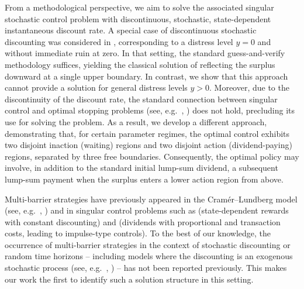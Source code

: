 \documentclass[11pt]{article} %
\numberwithin{komcounter}{section}
\numberwithin{equation}{section}
\numberwithin{theorem}{section}
\begin{document}
From a methodological perspective, we aim to solve the associated singular stochastic control problem with discontinuous, stochastic, state-dependent instantaneous discount rate. 
A special case of discontinuous stochastic discounting was considered in \cite{albrecher2011optimal}, corresponding to a distress level $y=0$ and without immediate ruin at zero. 
In that setting, the standard guess-and-verify methodology suffices, yielding the classical solution of reflecting the surplus downward at a single upper boundary. 
In contrast, we show that this approach cannot provide a solution for general distress levels $y>0$. 
Moreover, due to the discontinuity of the discount rate, the standard connection between singular control and optimal stopping problems (see, e.g.~\cite{karatzas1984connections}, \cite{karatzas1985}) does not hold, precluding its use for solving the problem. 
As a result, we develop a different approach, demonstrating that, for certain parameter regimes, the optimal control exhibits two disjoint inaction (waiting) regions and two disjoint action (dividend-paying) regions, separated by three free boundaries. 
Consequently, the optimal policy may involve, in addition to the standard initial lump-sum dividend, a subsequent lump-sum payment when the surplus enters a lower action region from above.

Multi-barrier strategies have previously appeared in the Cramér–Lundberg model (see, e.g.~\cite{albrecher2023optimal}, \cite{azcue2005optimal}) and in singular control problems such as \cite{junca2024optimal} (state-dependent rewards with constant discounting) and \cite{bai2012non} (dividends with proportional and transaction costs, leading to impulse-type controls). 
To the best of our knowledge, the occurrence of multi-barrier strategies in the context of stochastic discounting or random time horizons -- including models where the discounting is an exogenous stochastic process (see, e.g.~\cite{AKYILDIRIM201493}, \cite{https://doi.org/10.1111/mafi.12339}) -- has not been reported previously. 
This makes our work the first to identify such a solution structure in this setting.
 
\end{document}
